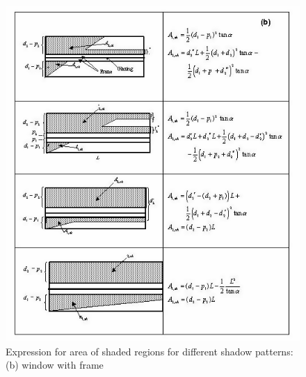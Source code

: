 \begin{figure}[htbp]
\centering
\includegraphics{media/image1606.png}
\caption{Expression for area of shaded regions for different shadow patterns: (b) window with frame}
\label{fig:expression-for-area-of-shaded-regions-part-b}
\end{figure}


